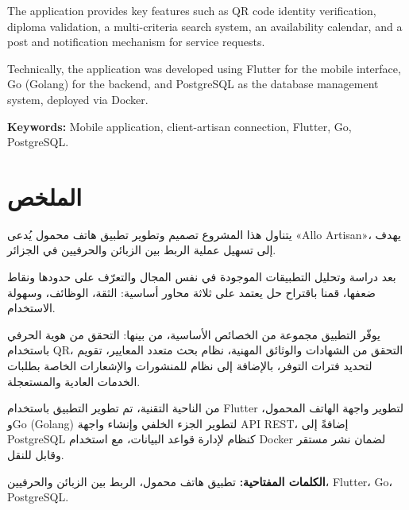 \documentclass[12pt,a4paper]{report}
\begin{document}
The application provides key features such as QR code identity verification, diploma validation, a multi-criteria search system, an availability calendar, and a post and notification mechanism for service requests.

Technically, the application was developed using Flutter for the mobile interface, Go (Golang) for the backend, and PostgreSQL as the database management system, deployed via Docker.

\textbf{Keywords:} Mobile application, client-artisan connection, Flutter, Go, PostgreSQL.

\vspace{1cm}

\section*{الملخص}

{\arabicfont
\begin{RTL}


\noindent
يتناول هذا المشروع تصميم وتطوير تطبيق هاتف محمول يُدعى \textenglish{«Allo Artisan»}، يهدف إلى تسهيل عملية الربط بين الزبائن والحرفيين في الجزائر.

بعد دراسة وتحليل التطبيقات الموجودة في نفس المجال والتعرّف على حدودها ونقاط ضعفها، قمنا باقتراح حل يعتمد على ثلاثة محاور أساسية: الثقة، الوظائف، وسهولة الاستخدام.

يوفّر التطبيق مجموعة من الخصائص الأساسية، من بينها: التحقق من هوية الحرفي باستخدام \textenglish{QR}، التحقق من الشهادات والوثائق المهنية، نظام بحث متعدد المعايير، تقويم لتحديد فترات التوفر، بالإضافة إلى نظام للمنشورات والإشعارات الخاصة بطلبات الخدمات العادية والمستعجلة.

من الناحية التقنية، تم تطوير التطبيق باستخدام \textenglish{Flutter} لتطوير واجهة الهاتف المحمول، و\textenglish{Go (Golang)} لتطوير الجزء الخلفي وإنشاء واجهة \textenglish{API REST}، إضافةً إلى \textenglish{PostgreSQL} كنظام لإدارة قواعد البيانات، مع استخدام \textenglish{Docker} لضمان نشر مستقر وقابل للنقل.

\vspace{0.3cm}
\textbf{الكلمات المفتاحية:} تطبيق هاتف محمول، الربط بين الزبائن والحرفيين، Flutter، Go، PostgreSQL.

\end{RTL}
}
\tableofcontents
\newpage
{}
\listoftables
\newpage
\end{document}
